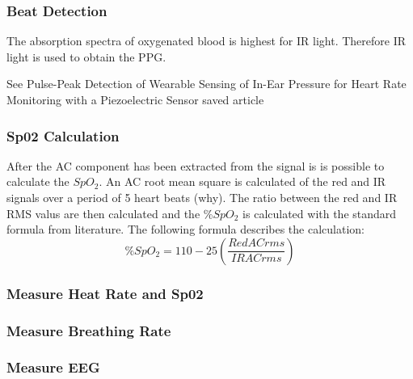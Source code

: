 \subsubsection{Beat Detection}
The absorption spectra of oxygenated blood is highest for IR light. Therefore IR light is used to obtain the PPG.

See Pulse-Peak Detection of Wearable Sensing of In-Ear Pressure for Heart Rate Monitoring with a Piezoelectric Sensor saved article

\subsubsection{Sp02 Calculation}
After the AC component has been extracted from the signal is is possible to calculate the $SpO_2$. An AC root mean square is calculated of the red and IR signals over a period of 5 heart beats (why). The ratio between the red and IR RMS valus are then calculated and the \%$SpO_2$ is calculated with the standard formula from literature. The following formula describes the calculation: $$\%SpO_2 = 110-25\left(\frac{Red ACrms}{IR ACrms}\right)$$

\subsubsection{Measure Heat Rate and Sp02}

\subsubsection{Measure Breathing Rate}




\subsubsection{Measure EEG}